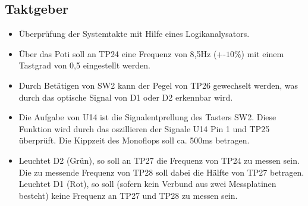 \newpage
\subsection{Taktgeber}


\begin{itemize}
	\item{Überprüfung der Systemtakte mit Hilfe eines Logikanalysators.}
	
	 \item{Über das Poti soll an TP24 eine Frequenz von 8,5Hz (+-$10\%$) mit einem Tastgrad von 0,5 eingestellt werden.}
	 
	 \item{Durch Betätigen von SW2 kann der Pegel von TP26 gewechselt werden, was durch das optische Signal von D1 oder D2 erkennbar wird.}
	 
	 \item{Die Aufgabe von U14 ist die Signalentprellung des Tasters SW2. Diese Funktion wird durch das oszillieren der Signale U14 Pin 1 und TP25 überprüft. Die Kippzeit des Monoflops soll ca. 500ms betragen.}
	 
	 \item{Leuchtet D2 (Grün), so soll an TP27 die Frequenz von TP24 zu messen sein. Die zu messende Frequenz von TP28 soll dabei die Hälfte von TP27 betragen. Leuchtet D1 (Rot), so soll (sofern kein Verbund aus zwei Messplatinen besteht) keine Frequenz an TP27 und TP28 zu messen sein.}	 
\end{itemize}


